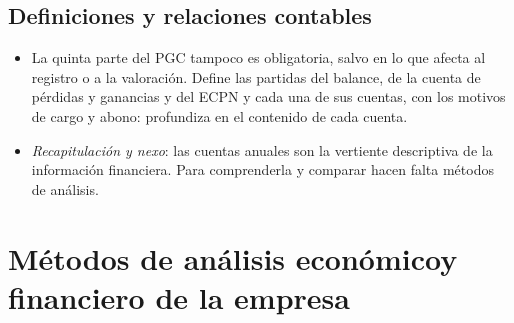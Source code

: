 \documentclass[11pt]{article}
\begin{document}
\subsection{Definiciones y relaciones contables}\label{sec:definiciones}

\begin{itemize}
\item La quinta parte del PGC tampoco es obligatoria, salvo en lo que afecta al registro o a la valoración. Define las partidas del balance, de la cuenta de pérdidas y ganancias y del ECPN y cada una de sus cuentas, con los motivos de cargo y abono: profundiza en el contenido de cada cuenta.
\item \emph{Recapitulación y nexo}: las cuentas anuales son la vertiente descriptiva de la información financiera. Para comprenderla y comparar hacen falta métodos de análisis.
\end{itemize}

\section{Métodos de análisis económico\cortetitulo y financiero de la empresa}\label{sec:metodos}
\end{document}
